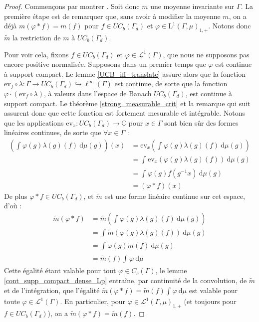 \documentclass[a4paper,12pt]{article}
\newcommand{\C}{\mathbb{C}}
\newcommand{\ev}{\mathrm{ev}}
\newcommand{\integral}[4]{\int_{#1}^{#2} #3~\mathrm{d}#4}
\newcommand{\inv}{^{-1}}
\newcommand{\comp}{\circ}
\renewcommand{\implies}{\Rightarrow}
\newcommand{\TODO}[1]{{\color{red}TODO :} #1}
\begin{document}
\begin{proof}
    Commençons par montrer \framebox{$(\ref{amenable_TFAE/amenable})\implies(\ref{amenable_TFAE/topological_mean})$}. Soit donc 
    $m$ une moyenne invariante sur $\Gamma$. La première étape est de remarquer que, sans avoir à modifier la moyenne 
    $m$, on a déjà $m(\varphi\ast f) = m(f)$ pour $f\in UC_b(\Gamma_d)$ et $\varphi\in\mathrm{L}^1(\Gamma, \mu)_{1, +}$.
    Notons donc $\widetilde{m}$ la restriction de $m$ à $UC_b(\Gamma_d)$.

    Pour voir cela, fixons $f\in UC_b(\Gamma_d)$ et $\varphi\in\mathscr{L}^1(\Gamma)$, que nous ne supposons pas encore positive normalisée.
    Supposons dans un premier temps que $\varphi$ est continue à support compact. Le lemme \ref{UCB_iff_translate} assure 
    alors que la fonction $\ev_f\comp\lambda:\Gamma\to UC_b(\Gamma_d)\hookrightarrow\ell^\infty(\Gamma)$ est continue,
    de sorte que la fonction $\varphi\cdot(\ev_f\comp\lambda)$, à valeurs dans l'espace de Banach $UC_b(\Gamma_d)$, est continue à support compact.
    Le théorème \ref{strong_measurable_crit} et la remarque qui suit assurent donc que cette fonction est fortement mesurable et intégrable.
    Notons que les applications $\ev_x:UC_b(\Gamma_d)\to\C$ pour $x\in\Gamma$ sont bien sûr des formes linéaires continues, de sorte que $\forall x\in\Gamma$ :
    \begin{align*}
        \left(\integral{}{}{\varphi(g)\lambda(g)(f)}{\mu(g)}\right)(x) 
            &= \ev_x\left(\integral{}{}{\varphi(g)\lambda(g)(f)}{\mu(g)}\right) \\
            &= \integral{}{}{\ev_x(\varphi(g)\lambda(g)(f))}{\mu(g)} \\
            &= \integral{}{}{\varphi(g)f(g\inv x)}{\mu(g)} \\
            &= (\varphi\ast f)(x)
    \end{align*}
    De plus $\varphi\ast f\in UC_b(\Gamma_d)$, et $\widetilde{m}$ est une forme linéaire continue sur cet espace, d'où :
    \begin{align*}
        \widetilde{m}(\varphi\ast f) 
            &= \widetilde{m}\left(\integral{}{}{\varphi(g)\lambda(g)(f)}{\mu(g)}\right) \\
            &= \integral{}{}{\widetilde{m}(\varphi(g)\lambda(g)(f))}{\mu(g)} \\
            &= \integral{}{}{\varphi(g)\widetilde{m}(f)}{\mu(g)} \\
            &= \widetilde{m}(f)\integral{}{}{\varphi}{\mu}
    \end{align*}
    Cette égalité étant valable pour tout $\varphi\in C_c(\Gamma)$, le lemme \ref{cont_supp_compact_dense_Lp} entraîne, par continuité de la convolution, 
    de $\widetilde{m}$ et de l'intégration, que l'égalité $\widetilde{m}(\varphi\ast f) = \widetilde{m}(f)\integral{}{}{\varphi}{\mu}$ est valable 
    pour toute $\varphi\in\mathscr{L}^1(\Gamma)$. En particulier, pour $\varphi\in\mathscr{L}^1(\Gamma, \mu)_{1, +}$ (et toujours pour 
    $f\in UC_b(\Gamma_d)$), on a $\widetilde{m}(\varphi\ast f) = \widetilde{m}(f)$.
    

\end{proof}
\end{document}
